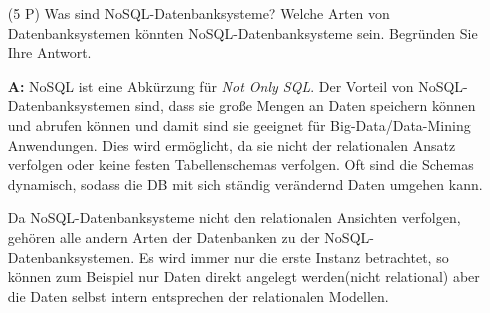 \documentclass[12pt]{report}
\newcommand{\answer}{\textbf{A:}}
\begin{document}
\begin{enumerate}

\item[(5 P)] Was sind NoSQL-Datenbanksysteme? Welche Arten von Datenbanksystemen könnten NoSQL-Datenbanksysteme sein. Begründen Sie Ihre Antwort.
\item[\answer]
NoSQL ist eine Abkürzung für \textit{Not Only SQL}. Der Vorteil von NoSQL-Datenbanksystemen sind, dass sie große Mengen an Daten speichern können und abrufen können und damit sind sie geeignet für Big-Data/Data-Mining Anwendungen. Dies wird ermöglicht, da sie nicht der relationalen Ansatz verfolgen oder keine festen Tabellenschemas verfolgen. Oft sind die Schemas dynamisch, sodass die DB mit sich ständig verändernd Daten umgehen kann.

Da NoSQL-Datenbanksysteme nicht den relationalen Ansichten verfolgen, gehören alle andern Arten der Datenbanken zu der NoSQL-Datenbanksystemen. Es wird immer nur die erste Instanz betrachtet, so können zum Beispiel nur Daten direkt angelegt werden(nicht relational) aber die Daten selbst intern entsprechen der relationalen Modellen.\\


\end{enumerate}
\end{document}
